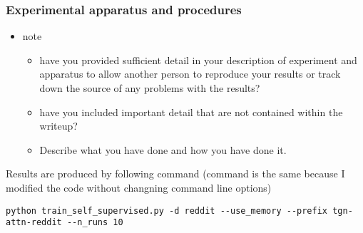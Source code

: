\documentclass[11pt]{article}
\begin{document}
\subsubsection{Experimental apparatus and procedures}
\label{sec:orga945ad2}
\begin{itemize}
\item note
\begin{itemize}
\item have you provided sufficient detail in your description of experiment and apparatus to allow another person to reproduce your results or track down the source of any problems with the results?
\item have you included important detail that are not contained within the writeup?
\item Describe what you have done and how you have done it.
\end{itemize}
\end{itemize}

Results are produced by following command (command is the same because I modified the code without changning command line options)
\begin{verbatim}
python train_self_supervised.py -d reddit --use_memory --prefix tgn-attn-reddit --n_runs 10
\end{verbatim}
\end{document}
